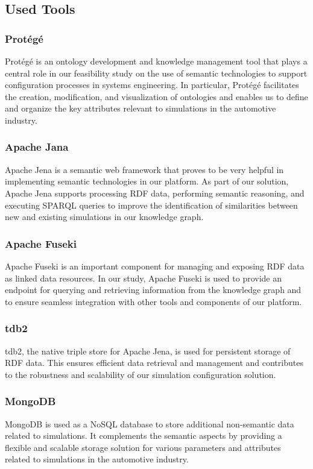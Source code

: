 \subsection{Used Tools}
    \subsubsection{Protégé \label{subsubsec:protege}}
    Protégé is an ontology development and knowledge management tool that plays a central role in our feasibility study on the use of semantic technologies to support configuration processes in systems engineering. In particular, Protégé facilitates the creation, modification, and visualization of ontologies and enables us to define and organize the key attributes relevant to simulations in the automotive industry.
    
    \subsubsection{Apache Jana}
    Apache Jena is a semantic web framework that proves to be very helpful in implementing semantic technologies in our platform. As part of our solution, Apache Jena supports processing RDF data, performing semantic reasoning, and executing SPARQL queries to improve the identification of similarities between new and existing simulations in our knowledge graph.
    
    \subsubsection{Apache Fuseki}
    Apache Fuseki is an important component for managing and exposing RDF data as linked data resources. In our study, Apache Fuseki is used to provide an endpoint for querying and retrieving information from the knowledge graph and to ensure seamless integration with other tools and components of our platform.

    
    \subsubsection{\acrshort{tdb2}}
    \acrshort{tdb2}, the native triple store for Apache Jena, is used for persistent storage of RDF data. This ensures efficient data retrieval and management and contributes to the robustness and scalability of our simulation configuration solution.
    
    
    \subsubsection{MongoDB}
    MongoDB is used as a NoSQL database to store additional non-semantic data related to simulations. It complements the semantic aspects by providing a flexible and scalable storage solution for various parameters and attributes related to simulations in the automotive industry.
    
